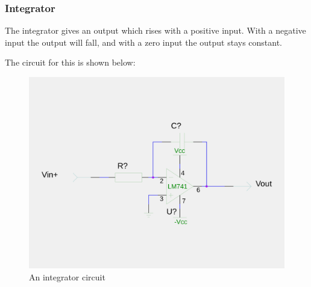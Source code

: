 \subsubsection{Integrator}
The integrator gives an output which rises with a positive input.
With a negative input the output will fall, and with a zero input the output stays constant.

The circuit for this is shown below:

\begin{figure}[H]
	\centering
	\includegraphics[width=\textwidth]{./images/integrator.png}
	\caption{An integrator circuit}
	\label{fig:integrator}
\end{figure}
